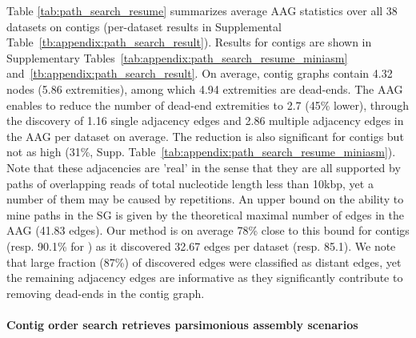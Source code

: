 \documentclass[./main.tex]{subfiles}
\newcommand{\modafterreview}[1]{#1}
\begin{document}
Table \ref{tab:path_search_resume} summarizes average AAG statistics over all \modafterreview{38} datasets on \canu contigs (per-dataset results in Supplemental Table~\ref{tb:appendix:path_search_result}). \modafterreview{Results for \miniasm contigs are shown in Supplementary Tables~\ref{tab:appendix:path_search_resume_miniasm} and~\ref{tb:appendix:path_search_result}.} On average, \canu contig graphs contain \modafterreview{4.32} nodes (\modafterreview{5.86} extremities), among which \modafterreview{4.94} extremities are dead-ends. The AAG enables to reduce the number of dead-end extremities to \modafterreview{2.7 (45\% lower)}, through the discovery of \modafterreview{1.16} single adjacency edges and \modafterreview{2.86} multiple adjacency edges in the AAG \modafterreview{per dataset on average}. \modafterreview{The reduction is also significant for \miniasm contigs but not as high (31\%, Supp. Table~\ref{tab:appendix:path_search_resume_miniasm}).} Note that these adjacencies are 'real' in the sense that they are all supported by paths \modafterreview{of overlapping reads} of \modafterreview{total nucleotide} length less than 10kbp, yet a number of them may be caused by repetitions. An upper bound on the ability to mine paths in the SG is given by the theoretical maximal number of edges in the AAG (\modafterreview{41.83} edges). Our method is \modafterreview{on average 78\%} close to this bound for \canu contigs \modafterreview{(resp. 90.1\% for \miniasm)} as it discovered \modafterreview{32.67} edges \modafterreview{per dataset (resp. 85.1)}. We note that large fraction (\modafterreview{87\%}) of \modafterreview{discovered edges} were classified as distant edges, yet the remaining adjacency edges are informative as they significantly contribute to removing dead-ends in the contig graph.

\paragraph{Contig order search retrieves parsimonious assembly scenarios}
\end{document}
